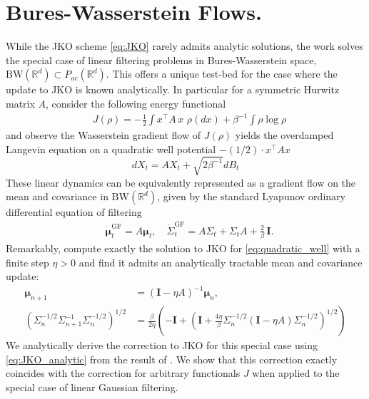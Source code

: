 \documentclass[reqno,11pt,letterpaper]{amsart}
\theoremstyle{plain}
\theoremstyle{definition}
\theoremstyle{remark}
\newcommand{\mb}{\mathbf}
\newcommand{\wass}{\mathrm{GF}}
\newcommand{\id}{\mathbf{I}}
\begin{document}
\section{Bures-Wasserstein Flows.}\label{sec:BW-flows}

While the JKO scheme \eqref{eq:JKO} rarely admits analytic solutions, the work \cite{Halder2017} solves the special case of linear filtering problems in Bures-Wasserstein space, $\mathrm{BW}(\mathbb{R}^{d})\subset{P}_{ac}(\mathbb{R}^{d})$. This offers a unique test-bed for the case where the update to JKO is known analytically. In particular for a symmetric Hurwitz matrix $A$, \cite{Halder2017} consider the following energy functional %
\begin{align}\label{eq:quadratic_well}
&J(\rho) = - \frac{1}{2} \int x^{\top} A\, x\,\, \rho(dx) + \beta^{-1} \int \rho \log \rho%
\end{align}
and observe the Wasserstein gradient flow of $J(\rho)$ yields the overdamped Langevin equation on a quadratic well potential $- (1/2)\cdot  x^{\top} A x$
\[
dX_{t} =  A X_{t} + \sqrt{2\beta^{-1}} dB_{t}
\]
These linear dynamics can be equivalently represented as a gradient flow on the mean and covariance in $\mathrm{BW}(\mathbb{R}^{d})$, given by the standard Lyapunov ordinary differential equation of filtering
\begin{align}\label{eq:Lyapunov}
&\dot{\bm{\mu}}^{\wass}_{t} = A \bm{\mu}_{t}, \quad \dot{\Sigma}_{t}^{\wass} = A \Sigma_{t} + \Sigma_{t} A + \frac{2}{\beta}\, \mathbf{I}.
\end{align}
Remarkably, \cite{Halder2017} compute exactly the solution to JKO for \eqref{eq:quadratic_well} with a finite step $\eta>0$ and find it admits an analytically tractable mean and covariance update:
\begin{align}\label{eq:JKO_analytic}
    \bm{\mu}_{n+1} &= (\mb{I} - \eta A )^{-1} \bm{\mu}_{n},  \\
    \label{eq:JKO_analytic_2} \left(
   \Sigma_{n}^{-1/2} \Sigma_{n+1}^{-1} \Sigma_{n}^{-1/2}
   \right)^{1/2} &= \frac{\beta}{2 \eta} \left( - \id + \left(
    \mathbf{I} + \frac{4 \eta}{\beta} \Sigma_{n}^{-1/2} (\id - \eta A ) \Sigma_{n}^{-1/2}
   \right)^{1/2}
   \right)
\end{align}
We analytically derive the correction to JKO for this special case using \eqref{eq:JKO_analytic} from the result of \cite{Halder2017}. We show that this correction exactly coincides with the correction for arbitrary functionals $J$ when applied to the special case of linear Gaussian filtering.
\end{document}
